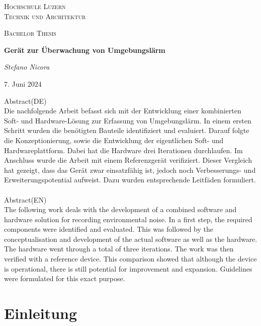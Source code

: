 \documentclass[12pt]{article}
\begin{document}
	\begin{titlepage}
		\centering
		\vspace{1cm}
		{\scshape\LARGE Hochschule Luzern \\ Technik und Architektur \par}
		\vspace{1cm}
		{\scshape\Large Bachelor Thesis\par}
		\vspace{1.5cm}
		{\huge\bfseries Gerät zur Überwachung von Umgebungslärm\par}
		\vspace{2cm}
		{\Large\itshape Stefano Nicora\par}
		
		\vfill
		
		{\large 7. Juni 2024\par}
	\end{titlepage}
	\tableofcontents
	
	\newpage
	Abstract(DE)\\
	Die nachfolgende Arbeit befasst sich mit der Entwicklung einer kombinierten Soft- und Hardware-Lösung zur Erfassung von Umgebungslärm. In einem ersten Schritt wurden die benötigten Bauteile identifiziert und evaluiert. Darauf folgte die Konzeptionierung, sowie die Entwicklung der eigentlichen Soft- und Hardwareplattform. Dabei hat die Hardware drei Iterationen durchlaufen. Im Anschluss wurde die Arbeit mit einem Referenzgerät verifiziert. Dieser Vergleich hat gezeigt, dass das Gerät zwar einsatzfähig ist, jedoch noch Verbesserungs- und Erweiterungspotential aufweist. Dazu wurden entsprechende Leitfäden formuliert. \\
	\\
	Abstract(EN)\\
	The following work deals with the development of a combined software and hardware solution for recording environmental noise. In a first step, the required components were identified and evaluated. This was followed by the conceptualisation and development of the actual software as well as the hardware. The hardware went through a total of three iterations. The work was then verified with a reference device. This comparison showed that although the device is operational, there is still potential for improvement and expansion. Guidelines were formulated for this exact purpose.
	
	\newpage
	\section{Einleitung}
\end{document}
